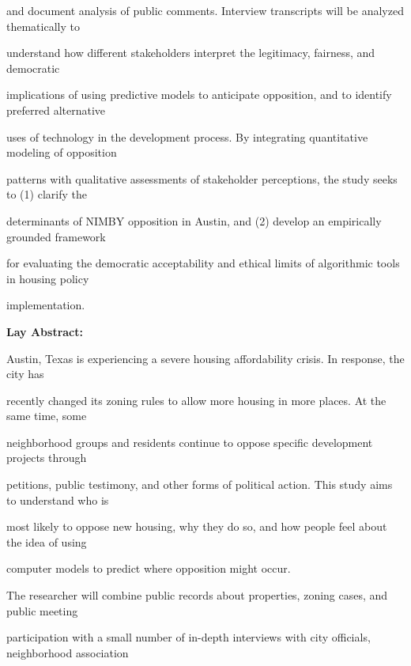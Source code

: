\documentclass[10pt, letterpaper]{article}
\begin{document}
and document analysis of public comments. Interview transcripts will be analyzed thematically to

understand how different stakeholders interpret the legitimacy, fairness, and democratic

\vspace{0.5em}

\vspace{0.5em}

implications of using predictive models to anticipate opposition, and to identify preferred alternative

uses of technology in the development process. By integrating quantitative modeling of opposition

patterns with qualitative assessments of stakeholder perceptions, the study seeks to (1) clarify the

determinants of NIMBY opposition in Austin, and (2) develop an empirically grounded framework

for evaluating the democratic acceptability and ethical limits of algorithmic tools in housing policy

implementation.

\vspace{0.5em}

\noindent \textbf{Lay Abstract:}

\begin{responsebox}

Austin, Texas is experiencing a severe housing affordability crisis. In response, the city has

\end{responsebox}

recently changed its zoning rules to allow more housing in more places. At the same time, some

neighborhood groups and residents continue to oppose specific development projects through

petitions, public testimony, and other forms of political action. This study aims to understand who is

most likely to oppose new housing, why they do so, and how people feel about the idea of using

computer models to predict where opposition might occur.

The researcher will combine public records about properties, zoning cases, and public meeting

participation with a small number of in-depth interviews with city officials, neighborhood association
\end{document}
